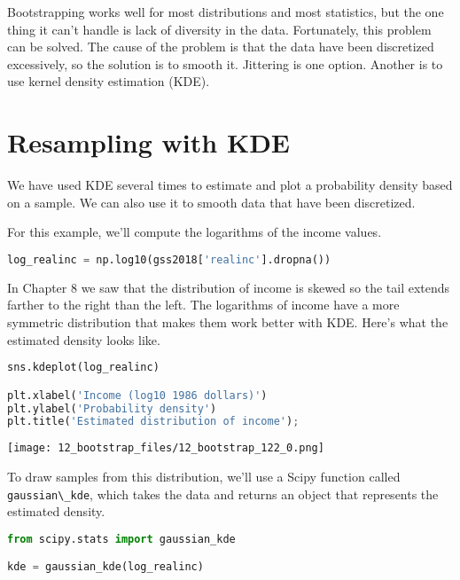 Bootstrapping works well for most distributions and most statistics, but
the one thing it can't handle is lack of diversity in the data.
Fortunately, this problem can be solved. The cause of the problem is
that the data have been discretized excessively, so the solution is to
smooth it. Jittering is one option. Another is to use kernel density
estimation (KDE).


\section{Resampling with KDE}\label{resampling-with-kde}

We have used KDE several times to estimate and plot a probability
density based on a sample. We can also use it to smooth data that have
been discretized.

For this example, we'll compute the logarithms of the income values.

\begin{lstlisting}[language=Python,style=source]
log_realinc = np.log10(gss2018['realinc'].dropna())
\end{lstlisting}

In Chapter 8 we saw that the distribution of income is skewed so the tail extends farther to the right than the left.
The logarithms of income have a more symmetric distribution that makes them work better with KDE.
Here's what the estimated density looks like.

\begin{lstlisting}[language=Python,style=source]
sns.kdeplot(log_realinc)

plt.xlabel('Income (log10 1986 dollars)')
plt.ylabel('Probability density')
plt.title('Estimated distribution of income');
\end{lstlisting}

\begin{center}
\texttt{[image: 12\_bootstrap\_files/12\_bootstrap\_122\_0.png]}
\end{center}

To draw samples from this distribution, we'll use a Scipy function
called \passthrough{\lstinline!gaussian\_kde!}, which takes the data and
returns an object that represents the estimated density.

\begin{lstlisting}[language=Python,style=source]
from scipy.stats import gaussian_kde

kde = gaussian_kde(log_realinc)
\end{lstlisting}

